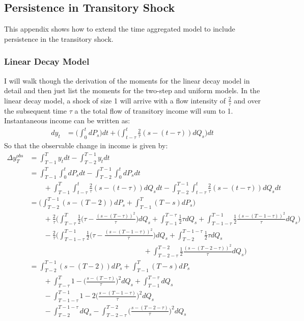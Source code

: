 \subsection{Persistence in Transitory Shock} \label{persistence_appendix}
This appendix shows how to extend the time aggregated model to include persistence in the transitory shock.

\subsubsection{Linear Decay Model}
I will walk though the derivation of the moments for the linear decay model in detail and then just list the moments for the two-step and uniform models. In the linear decay model, a shock of size 1 will arrive with a flow intensity of $\frac{2}{\tau}$ and over the subsequent time $\tau$ a the total flow of transitory income will sum to 1. Instantaneous income can be written as:
 \begin{align*}
dy_t &= \Big(\int_{0}^{t} dP_s \Big) dt +\Big(\int_{t-\tau}^{t} \frac{2}{\tau}(s-(t-\tau)) dQ_s \Big)dt
 \end{align*}
So that the observable change in income is given by:
\begin{align}
\Delta y^{obs}_T &= \int_{T-1}^{T} y_t dt - \int_{T-2}^{T-1} y_t dt \nonumber \\ 
&= \int_{T-1}^{T} \int_{0}^{t}dP_s dt -\int_{T-2}^{T-1} \int_{0}^{t}dP_s dt \nonumber \\
& \qquad +  \int_{T-1}^{T} \int_{t-\tau}^{t} \frac{2}{\tau}(s-(t-\tau)) dQ_s dt -\int_{T-2}^{T-1}\int_{t-\tau}^{t} \frac{2}{\tau}(s-(t-\tau)) dQ_s dt \nonumber \\
&= \Big(\int_{T-2}^{T-1} (s-(T-2))dP_s  + \int_{T-1}^{T} (T-s)dP_s \Big) \nonumber \\
&  \qquad +\frac{2}{\tau} \Big(\int_{T-\tau}^{T} \frac{1}{2}\Big(\tau - \frac{(s-(T-\tau))^2}{\tau} \Big)dQ_s  +\int_{T-1}^{T-\tau} \frac{1}{2}\tau dQ_s  +\int_{T-1-\tau}^{T-1} \frac{1}{2}\frac{(s-(T-1-\tau))^2}{\tau} dQ_s \Big) \nonumber \\
& \qquad -\frac{2}{\tau}  \Big(\int_{T-1-\tau}^{T-1} \frac{1}{2}\Big(\tau - \frac{(s-(T-1-\tau))^2}{\tau} \Big)dQ_s  +\int_{T-2}^{T-1-\tau} \frac{1}{2}\tau dQ_s \nonumber \\
& \qquad \qquad \qquad \qquad \qquad \qquad \qquad \qquad  +\int_{T-2-\tau}^{T-2} \frac{1}{2}\frac{(s-(T-2-\tau))^2}{\tau} dQ_s \Big) \nonumber \\
&= \int_{T-2}^{T-1} (s-(T-2))dP_s  + \int_{T-1}^{T} (T-s)dP_s  \nonumber \\
&  \qquad +\int_{T-\tau}^{T} 1 - \Big(\frac{s-(T-\tau)}{\tau}\Big)^2 dQ_s  +\int_{T-1}^{T-\tau}  dQ_s   \nonumber \\
& \qquad - \int_{T-1-\tau}^{T-1} 1 - 2\Big(\frac{s-(T-1-\tau)}{\tau}\Big)^2 dQ_s \nonumber \\
& \qquad-  \int_{T-2}^{T-1-\tau}  dQ_s  -\int_{T-2-\tau}^{T-2} \Big(\frac{s-(T-2-\tau)}{\tau}\Big)^2 dQ_s 
\end{align}
